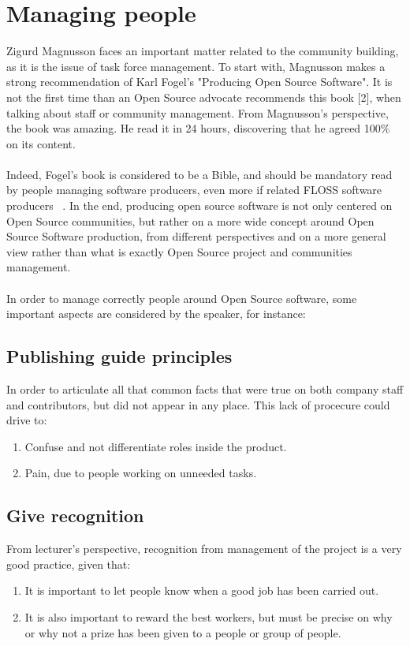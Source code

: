 \documentclass[11pt]{article}
\begin{document}
\section{Managing people}
  Zigurd Magnusson faces an important matter related to the community building, as it is the issue of task force management. To start with, Magnusson makes a strong recommendation of Karl Fogel's "Producing Open Source Software". It is not the first time than an Open Source advocate recommends this book [2], when talking about staff or community management. From Magnusson's perspective, the book was amazing. He read it in 24 hours, discovering that he agreed 100\% on its content.\\
\\
Indeed, Fogel's book is considered to be a Bible, and should be mandatory read by people managing software producers, even more if related FLOSS software producers ~\cite{POIS00}.  In the end, producing open source software is not only centered on Open Source communities, but rather on a more wide concept around Open Source Software production, from different perspectives and on a more general view rather than what is exactly Open Source project and communities management.\\
\\
In order to manage correctly people around Open Source software, some important aspects are considered by the speaker, for instance:

\subsection{Publishing guide principles}
In order to articulate all that common facts that were true on both company staff and contributors, but did not appear in any place. This lack of procecure could drive to:
\begin{enumerate}\itemsep0pt
\item{Confuse and not differentiate roles inside the product.}
\item{Pain, due to people working on unneeded tasks.}
\end{enumerate}

\subsection{Give recognition}
From lecturer's perspective, recognition from management of the project is a very good practice, given that:
\begin{enumerate}\itemsep0pt
\item{It is important to let people know when a good job has been carried out}.
\item{It is also important to reward the best workers, but must be precise on why or why not a prize has been given to a people or group of people}.
\end{enumerate}
\end{document}
